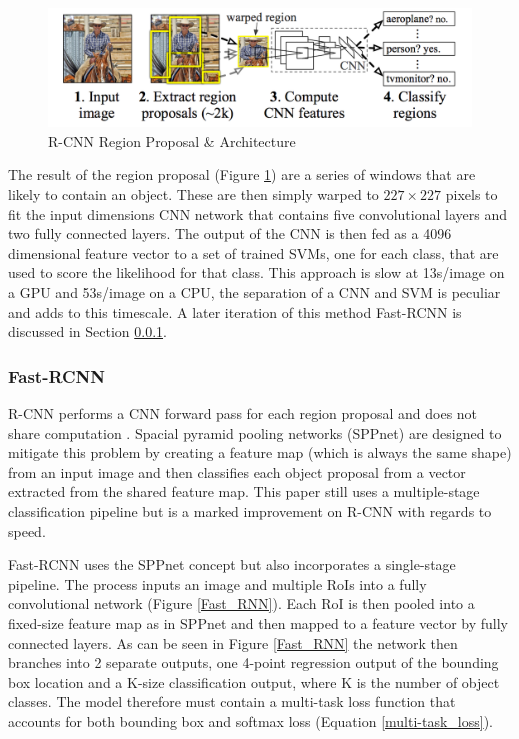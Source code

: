 \documentclass[a4paper,11pt,notitlepage]{article}
\begin{document}
\noindent \begin{figure}[h!]
\label{Selective_search}
\includegraphics[width = 1.0\hsize]{./figures/region_prop.png}
\caption{R-CNN Region Proposal \& Architecture \cite{DBLP:journals/corr/GirshickDDM13}}
\end{figure}

The result of the region proposal (Figure \ref{Selective_search}) are a series of windows that are likely to contain an object. These are then simply warped to $227 \times 227$ pixels to fit the input dimensions CNN network that contains five convolutional layers and two fully connected layers. The output of the CNN is then fed as a 4096 dimensional feature vector to a set of trained SVMs, one for each class, that are used to score the likelihood for that class. This approach is slow at 13s/image on a GPU and 53s/image on a CPU, the separation of a CNN and SVM is peculiar and adds to this timescale. A later iteration of this method Fast-RCNN is discussed in Section \ref{Fast_RCNN}.

\subsubsection{Fast-RCNN} \label{Fast_RCNN}

R-CNN performs a CNN forward pass for each region proposal and does not share computation \cite{DBLP:journals/corr/Girshick15}. Spacial pyramid pooling networks (SPPnet) \cite{DBLP:journals/corr/HeZR014} are designed to mitigate this problem by creating a feature map (which is always the same shape) from an input image and then classifies each object proposal from a vector extracted from the shared feature map. This paper still uses a multiple-stage classification pipeline but is a marked improvement on R-CNN with regards to speed. 

Fast-RCNN uses the SPPnet concept but also incorporates a single-stage pipeline. The process inputs an image and multiple RoIs into a fully convolutional network (Figure \ref{Fast_RNN}). Each RoI is then pooled into a fixed-size feature map as in SPPnet and then mapped to a feature vector by fully connected layers. As can be seen in Figure \ref{Fast_RNN} the network then branches into 2 separate outputs, one 4-point regression output of the bounding box location and a K-size classification output, where K is the number of object classes. The model therefore must contain a multi-task loss function that accounts for both bounding box and softmax loss (Equation \ref{multi-task_loss}).
\end{document}
